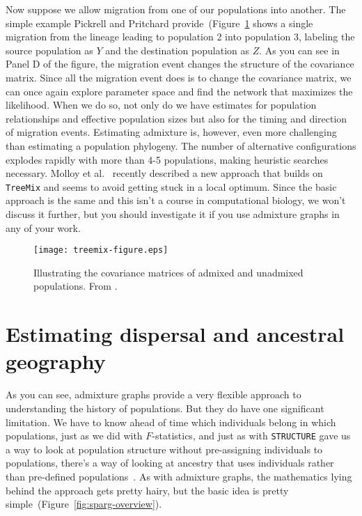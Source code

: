 \documentclass[12pt]{article}
\begin{document}
Now suppose we allow migration from one of our populations into
another. The simple example Pickrell and Pritchard
provide~(Figure~\ref{fig:treemix-figure} shows a single migration from
the lineage leading to population 2 into population 3, labeling the
source population as $Y$ and the destination population as $Z$. As you
can see in Panel D of the figure, the migration event changes the
structure of the covariance matrix. Since all the migration event does
is to change the covariance matrix, we can once again explore
parameter space and find the network that maximizes the
likelihood. When we do so, not only do we have estimates for
population relationships and effective population sizes but also for
the timing and direction of migration events. Estimating admixture is,
however, even more challenging than estimating a population
phylogeny. The number of alternative configurations explodes rapidly
with more than 4-5 populations, making heuristic searches
necessary. Molloy et al.~\cite{Molloy-etal-2021} recently described a
new approach that builds on {\tt TreeMix} and seems to avoid getting
stuck in a local optimum. Since the basic approach is the same and
this isn't a course in computational biology, we won't discuss it
further, but you should investigate it if you use admixture graphs in
any of your work.

\begin{figure}
  \begin{center}
    \texttt{[image: treemix-figure.eps]}
  \end{center}
  \caption{Illustrating the covariance matrices of admixed and
    unadmixed populations. From \cite{Pickrell-Pritchard-2012}.}\label{fig:treemix-figure}
\end{figure}

\section*{Estimating dispersal and ancestral
  geography}

As you can see, admixture graphs provide a very flexible approach to
understanding the history of populations. But they do have one
significant limitation. We have to know ahead of time which
individuals belong in which populations, just as we did with
$F$-statistics, and just as with
{\tt STRUCTURE} gave us a way to look at population structure without
pre-assigning individuals to populations, there's a way of looking at
ancestry that uses individuals rather than pre-defined
populations~\cite{Osmond-Coop-2021}. As with admixture graphs, the
mathematics lying behind the approach gets pretty hairy, but the basic
idea is pretty simple~(Figure~\ref{fig:sparg-overview}).
\end{document}
